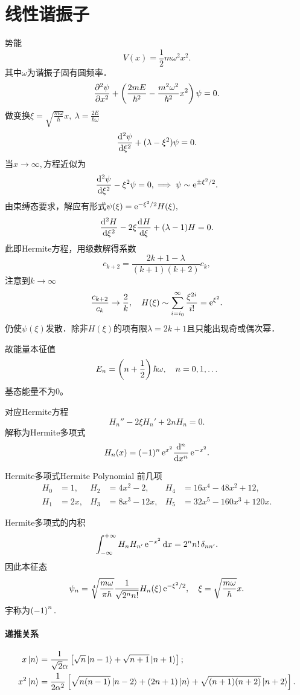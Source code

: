 \section{线性谐振子}
势能
\[
	V(x)=\frac12m\omega^2x^2.
\]
其中$\omega$为谐振子固有圆频率．
\[
	\pv[2]\psi{x}+\kh{\frac{2mE}{\hbar^2}-\frac{m^2\omega^2}{\hbar^2}x^2}\psi=0.
\]
做变换$\xi=\sqrt{\frac{m\omega}\hbar}x,~\lambda=\frac{2E}{\hbar\omega}$
\[
	\dv[2]\psi\xi+(\lambda-\xi^2)\psi=0.
\]
当$x\to\infty,$方程近似为
\[
	\dv[2]\psi\xi-\xi^2\psi=0,\implies\psi\sim\e{\pm\xi^2/2}.
\]
由束缚态要求，解应有形式$\psi(\xi)=\e{-\xi^2/2}H(\xi),$
\[
	\dv[2] H\xi-2\xi\dv H\xi+(\lambda-1)H=0.
\]
此即Hermite方程，用级数解得系数
\[
	c_{k+2}=\frac{2k+1-\lambda}{(k+1)(k+2)}c_k,
\]
注意到$k\to\infty$
\[
	\frac{c_{k+2}}{c_k}\to\frac{2}k,\quad H(\xi)\sim\sum_{i=i_0}^\infty\frac{\xi^{2i}}{i!}=\e{\xi^2}.
\]
仍使$\psi(\xi)$发散．除非$H(\xi)$的项有限$\lambda=2k+1$且只能出现奇或偶次幂．

故能量本征值
\begin{align}
	E_n=\kh{n+\frac12}\hbar\omega,\quad n=0,1,\ldots
\end{align}
基态能量不为0。

对应Hermite方程
\[
	H_n''-2\xi H_n'+2nH_n=0.
\]
解称为Hermite多项式
\[
	H_n(x)=(-1)^n\e{x^2}\dd[n]x\e{-x^2}.
\]
\begin{example}{Hermite多项式}{Hermite Polynomial}
	前几项 %
	\begin{align*}
		H_0 & =1,  & H_2 & =4x^2-2,   & H_4 & =16x^4-48x^2+12,    \\
		H_1 & =2x, & H_3 & =8x^3-12x, & H_5 & =32x^5-160x^3+120x.
	\end{align*}
	\iffalse
		\begin{align*}
			\psi_0 & \propto e^{-\xi^2/2}            & \psi_3 & \propto\frac1{\sqrt3}(2\xi^3-3\xi),
			\psi_1 & \propto\sqrt2\xi e^{-\xi^2/2}   & \psi_4 & \propto\frac1{2\sqrt6}(4\xi^4-12\xi^3+3),     \\
			\psi_2 & \propto\frac1{\sqrt2}(2\xi^2-1) & \psi_6 & \propto\frac1{2\sqrt{30}}(4\xi^5-20\xi^3+15).
		\end{align*}
	\fi
\end{example}
Hermite多项式的内积
\[
	\int\iti H_nH_{n'}\e{-x^2}\d x=2^nn!\,\delta_{nn'}.
\]
因此本征态
\begin{align}
	\psi_n=\sqrt[4]{\frac{m\omega}{\pi\hbar}}\frac1{\sqrt{2^nn!}}H_n(\xi)\e{-\xi^2/2},\quad\xi=\sqrt{\frac{m\omega}\hbar}x.
\end{align}
宇称为$\kh{-1}^n.$
\paragraph{递推关系}
\begin{align}
	x\ket n&=\frac1{\sqrt2\alpha}\fkh{\sqrt n\ket{n-1}+\sqrt{n+1}\ket{n+1}};\\
	x^2\ket n&%
	=\frac1{2\alpha^2}\fkh{\sqrt{n(n-1)}\ket{n-2}+(2n+1)\ket n+\sqrt{(n+1)(n+2)}\ket{n+2}}.
\end{align}